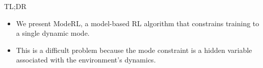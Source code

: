 \documentclass[final,12pt]{beamer}
\newlength{\colwidth}
\begin{document}
\begin{frame}[t]
\begin{columns}[t]
\begin{column}{\colwidth}
\begin{alertblock}{TL;DR}
   \begin{itemize}
      \item We present \alert{ModeRL}, a model-based RL algorithm that constrains training to a single dynamic mode.
      \item This is a difficult problem because the \alert{mode constraint} is a \alert{hidden variable} associated with the environment’s dynamics.


\end{itemize}
\end{alertblock}
\end{column}
\end{columns}
\end{frame}
\end{document}
